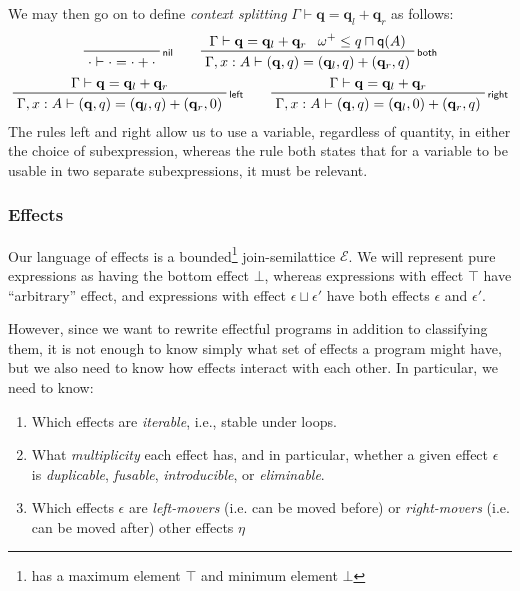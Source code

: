 \documentclass[acmsmall,screen,review]{acmart}
\newcommand{\mc}[1]{\ensuremath{\mathcal{#1}}}
\newcommand{\mb}[1]{\ensuremath{\mathbf{#1}}}
\newcommand{\ms}[1]{\ensuremath{\mathsf{#1}}}
\newcommand{\qsp}[4]{#1 \vdash #2 = #3 + #4}
\newcommand{\rle}[1]{{\scriptsize\textsf{#1}}}
\newcommand{\brle}[1]{{\textsf{#1}}}
\newcommand{\zeroq}{0}
\newcommand{\cpyq}{\omega^+}
\newcommand{\alquant}{\ms{q}}
\begin{document}
We may then go on to define \emph{context splitting} $\qsp{\Gamma}{\mb{q}}{\mb{q}_l}{\mb{q}_r}$ as
follows:
\begin{gather*}
  \prftree[r]{\rle{nil}}
    {\qsp{\cdot}{\cdot}{\cdot}{\cdot}} \qquad
  \prftree[r]{\rle{both}}
    {\qsp{\Gamma}{\mb{q}}{\mb{q}_l}{\mb{q}_r}}
    {\cpyq \leq q \sqcap \alquant(A)}
    {\qsp{\Gamma, x : A}{(\mb{q}, q)}{(\mb{q}_l, q)}{(\mb{q}_r, q)}}
    \\
  \prftree[r]{\rle{left}}
    {\qsp{\Gamma}{\mb{q}}{\mb{q}_l}{\mb{q}_r}}
    {\qsp{\Gamma, x : A}{(\mb{q}, q)}{(\mb{q}_l, q)}{(\mb{q}_r, \zeroq)}} \qquad
  \prftree[r]{\rle{right}}
    {\qsp{\Gamma}{\mb{q}}{\mb{q}_l}{\mb{q}_r}}
    {\qsp{\Gamma, x : A}{(\mb{q}, q)}{(\mb{q}_l, \zeroq)}{(\mb{q}_r, q)}}
\end{gather*}
The rules \brle{left} and \brle{right} allow us to use a variable, regardless of quantity, in either
the choice of subexpression, whereas the rule \brle{both} states that for a variable to be usable in
two separate subexpressions, it must be relevant.

\subsubsection{Effects}
Our language of effects is a bounded\footnote{has a maximum element $\top$ and minimum element
$\bot$} join-semilattice $\mc{E}$. We will represent pure expressions as having the bottom effect
$\bot$, whereas expressions with effect $\top$ have ``arbitrary'' effect, and expressions with
effect $\epsilon \sqcup \epsilon'$ have both effects $\epsilon$ and $\epsilon'$.

However, since we want to rewrite effectful programs in addition to classifying them, it is not
enough to know simply what set of effects a program might have, but we also need to know how effects
interact with each other. In particular, we need to know:
\begin{enumerate}
  \item Which effects are \emph{iterable}, i.e., stable under loops. 
  \item What \emph{multiplicity} each effect has, and in particular, whether a given effect
  $\epsilon$ is \emph{duplicable}, \emph{fusable}, \emph{introducible}, or \emph{eliminable}.
  \item Which effects $\epsilon$ are \emph{left-movers} (i.e. can be moved before) or
  \emph{right-movers} (i.e. can be moved after) other effects $\eta$
\end{enumerate}
\end{document}
